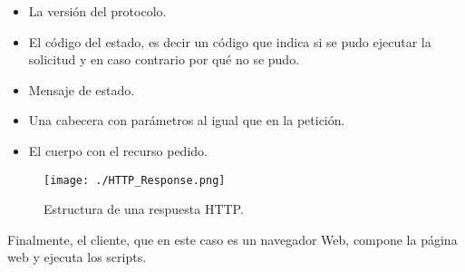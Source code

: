 \begin{itemize}
	\item La versión del protocolo.
	\item El código del estado, es decir un código que indica si se pudo ejecutar la solicitud y en caso contrario por qué no se pudo.
	\item Mensaje de estado.
	\item Una cabecera con parámetros al igual que en la petición.
	\item El cuerpo con el recurso pedido.
\end{itemize}

\begin{figure}[H]
	\centering
	\texttt{[image: ./HTTP\_Response.png]}
	\caption{Estructura de una respuesta HTTP.\protect\footnotemark}
	\label{fig:HTTP_Resp}
\end{figure}

Finalmente, el cliente, que en este caso es un navegador Web, compone la página web y ejecuta los scripts.

